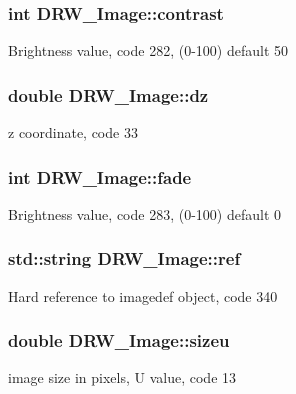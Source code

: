 \subsubsection[{contrast}]{\setlength{\rightskip}{0pt plus 5cm}int D\+R\+W\+\_\+\+Image\+::contrast}\label{class_d_r_w___image_ad3ba08920ac1d83d073ba1f408cceb09}
Brightness value, code 282, (0-\/100) default 50 \hypertarget{class_d_r_w___image_ada1bb1fd948f6318a4c8513e35b8224d}{}
\subsubsection[{dz}]{\setlength{\rightskip}{0pt plus 5cm}double D\+R\+W\+\_\+\+Image\+::dz}\label{class_d_r_w___image_ada1bb1fd948f6318a4c8513e35b8224d}
z coordinate, code 33 \hypertarget{class_d_r_w___image_a29d7bf7561ed378e6f4634557aae88db}{}
\subsubsection[{fade}]{\setlength{\rightskip}{0pt plus 5cm}int D\+R\+W\+\_\+\+Image\+::fade}\label{class_d_r_w___image_a29d7bf7561ed378e6f4634557aae88db}
Brightness value, code 283, (0-\/100) default 0 \hypertarget{class_d_r_w___image_a48302a8438fec582402a1c14126ffd5a}{}
\subsubsection[{ref}]{\setlength{\rightskip}{0pt plus 5cm}std\+::string D\+R\+W\+\_\+\+Image\+::ref}\label{class_d_r_w___image_a48302a8438fec582402a1c14126ffd5a}
Hard reference to imagedef object, code 340 \hypertarget{class_d_r_w___image_a99a8d4b8a7fb234f002b194d0e28d247}{}
\subsubsection[{sizeu}]{\setlength{\rightskip}{0pt plus 5cm}double D\+R\+W\+\_\+\+Image\+::sizeu}\label{class_d_r_w___image_a99a8d4b8a7fb234f002b194d0e28d247}
image size in pixels, U value, code 13 \hypertarget{class_d_r_w___image_ae2408c33253799a6e03ea1bfec4f84d7}{}
